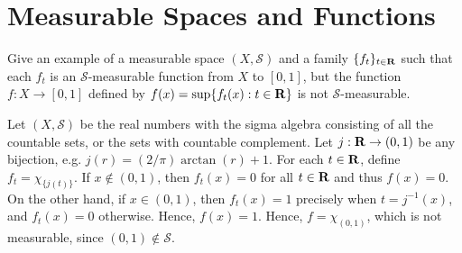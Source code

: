 \documentclass[11pt,oneside]{book}
\begin{document}
\section{Measurable Spaces and Functions}

\begin{exercise}
    Give an example of a measurable space $(X, \mathscr{S})$ and a family $\{f_t\}_{t \in \mathbf{R}}$ such that each $f_t$ is an $\mathscr{S}$-measurable function from $X$ to $[0, 1]$, but the function $f: X \to [0, 1]$ defined by $f(x) = \sup\{f_t(x): t \in \mathbf{R}\}$ is not $\mathscr{S}$-measurable.
\end{exercise}

\begin{solution}
    Let $(X, \mathscr{S})$ be the real numbers with the sigma algebra consisting of all the countable sets, or the sets with countable complement. Let $j: \mathbf{R} \to (0, 1)$ be any bijection, e.g. $j(r) = (2/\pi) \arctan(r) + 1$. For each $t \in \mathbf{R}$, define $f_t = \chi_{\{j(t)\}}$. If $x \not\in (0, 1)$, then $f_t(x) = 0$ for all $t \in \mathbf{R}$ and thus $f(x) = 0$. On the other hand, if $x \in (0, 1)$, then $f_t(x) = 1$ precisely when $t = j^{-1}(x)$, and $f_t(x) = 0$ otherwise. Hence, $f(x) = 1$. Hence, $f = \chi_{(0, 1)}$, which is not measurable, since $(0, 1) \not\in \mathscr{S}$.
\end{solution}
\end{document}
